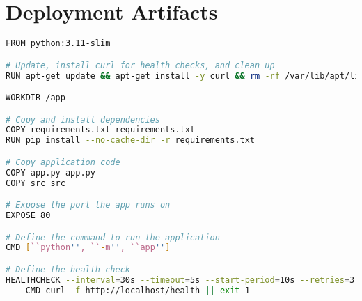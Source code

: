 \chapter{Deployment Artifacts}
\label{app:deployment-artifacts}

\begin{lstlisting}[language=bash, caption={Dockerfile}, label={lst:dockerfile}]
FROM python:3.11-slim

# Update, install curl for health checks, and clean up
RUN apt-get update && apt-get install -y curl && rm -rf /var/lib/apt/lists/*

WORKDIR /app

# Copy and install dependencies
COPY requirements.txt requirements.txt
RUN pip install --no-cache-dir -r requirements.txt

# Copy application code
COPY app.py app.py
COPY src src

# Expose the port the app runs on
EXPOSE 80

# Define the command to run the application
CMD [``python'', ``-m'', ``app'']

# Define the health check
HEALTHCHECK --interval=30s --timeout=5s --start-period=10s --retries=3 \
    CMD curl -f http://localhost/health || exit 1
\end{lstlisting}


\lstset{style=jsonstyle}


